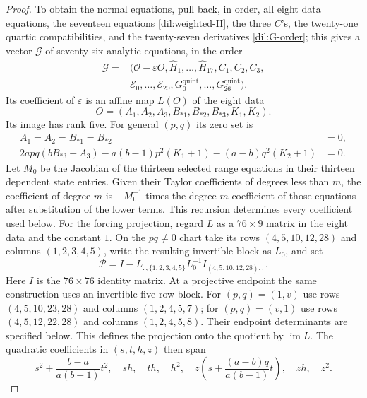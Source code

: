 \documentclass[11pt,a4paper]{article}
\numberwithin{equation}{section}
\theoremstyle{plain}
\theoremstyle{definition}
\theoremstyle{remark}
\begin{document}
\begin{proof}
To obtain the normal equations, pull back, in order, all eight data equations,
the seventeen equations \eqref{dil:weighted-H}, the three $C$'s,
the twenty-one quartic compatibilities, and the twenty-seven derivatives
\eqref{dil:G-order}; this gives a vector $\boldsymbol{\mathcal G}$ of seventy-six
analytic equations, in the order
\begin{equation}\label{adil:76}
\begin{aligned}
 \boldsymbol{\mathcal G}={}&(\mathscr O-\varepsilon O,\widehat H_1,\ldots,
 \widehat H_{17},C_1,C_2,C_3,\\
 &\mathcal E_0,\ldots,\mathcal E_{20},G_0^{\mathrm{quint}},\ldots,G_{26}^{\mathrm{quint}}).
\end{aligned}
\end{equation}  Its coefficient of $\varepsilon$ is an affine
map $L(O)$ of the eight data
\[
 O=(A_1,A_2,A_3,B_{*1},B_{*2},B_{*3},K_1,K_2).
\]
Its image has rank five.  For general $(p,q)$ its zero set is
\begin{align}\label{dil:forcing}
 A_1=A_2=B_{*1}=B_{*2}&=0,\\
 2apq(bB_{*3}-A_3)-a(b-1)p^2(K_1+1)
                     -(a-b)q^2(K_2+1)&=0.\nonumber
\end{align}
Let $M_0$ be the
Jacobian of the thirteen selected range equations in their thirteen
dependent state entries.  Given their Taylor coefficients of degrees
less than $m$, the coefficient of degree $m$ is
$-M_0^{-1}$ times the degree-$m$ coefficient of those equations after
substitution of the lower terms.  This recursion determines every
coefficient used below.  For the forcing projection, regard $L$ as a
$76\times9$ matrix in the eight data and the constant $1$.
On the $pq\ne0$ chart take its rows $(4,5,10,12,28)$ and columns
$(1,2,3,4,5)$, write the resulting invertible block as $L_0$, and set
\[
 \mathcal P=I-L_{:,\{1,2,3,4,5\}}L_0^{-1}I_{(4,5,10,12,28),:}.
\]
Here $I$ is the $76\times76$ identity matrix.
At a projective endpoint the same construction uses an invertible
five-row block.  For $(p,q)=(1,v)$ use rows
$(4,5,10,23,28)$ and columns $(1,2,4,5,7)$; for $(p,q)=(v,1)$
use rows $(4,5,12,22,28)$ and columns $(1,2,4,5,8)$.
Their endpoint determinants are specified below.
This defines the projection onto the quotient by $\operatorname{im}L$.
The
quadratic coefficients in $(s,t,h,z)$ then span
\begin{equation}\label{dil:quadratic-normal}
 s^2+\frac{b-a}{a(b-1)}t^2,\quad sh,\quad th,\quad h^2,\quad
 z\left(s+\frac{(a-b)q}{a(b-1)}t\right),\quad zh,\quad z^2.
\end{equation}

\end{proof}
\end{document}

